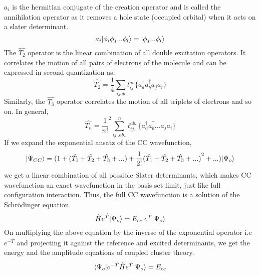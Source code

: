 $a_i$ is the hermitian conjugate of the creation operator and is called
the annihilation operator as it removes a hole state (occupied orbital) when it acts on a
slater determinant.
\begin{equation}
a_i| \phi_i\phi_j...\phi_l \rangle = | \phi_j...\phi_l \rangle
\end{equation}
The $\hat{T_2} $ operator is the linear combination of all double excitation operators.
It correlates the motion of all pairs of electrons of the molecule and can be expressed
in second quantization as:
\begin{equation}
\hat{T_2} = \frac{1}{4}\sum_{ijab}t^{ab}_{ij}\{a^\dagger_aa^\dagger_ba_ja_i\}
\end{equation}
Similarly, the ${\hat{T_3}}$ operator correlates the motion of all triplets of
electrons and so on. In general, \begin{equation}
\hat{T_n} = {\frac{1}{n!}}^2\sum_{ij..ab..}^nt^{ab..}_{ij..}\{a^\dagger_aa^\dagger_b...a_ja_i\}
\end{equation}
If we expand the exponential ansatz of the CC wavefunction,
\begin{equation}
| \Psi_{CC} \rangle = (1+(\hat{T_1} + \hat{T_2} + \hat{T_3} + ... ) + \frac{1}{2!}{(\hat{T_1} + \hat{T_2} + \hat{T_3} + ...)}^2 + ... )| \Psi_o \rangle
\end{equation}
we get a linear combination of all possible Slater determinants, which makes CC
wavefunction an exact wavefunction in the basis set limit, just like full
configuration interaction. Thus, the full CC
wavefunction is a solution of the Schr\"odinger equation.
\begin{equation}
\hat{H}e^{\hat{T}}| \Psi_o \rangle = E_{cc}\;e^{\hat{T}}| \Psi_o \rangle
\end{equation}
On multiplying the above equation by the inverse of the exponential operator i.e
$e^{-\hat{T}}$ and projecting it against the reference and excited
determinants, we get the energy and the amplitude equations of coupled cluster
theory.
\begin {equation}
\langle \Psi_o |e^{-\hat{T}}\hat{H}e^{\hat{T}}| \Psi_o \rangle = E_{cc}
\end{equation}
